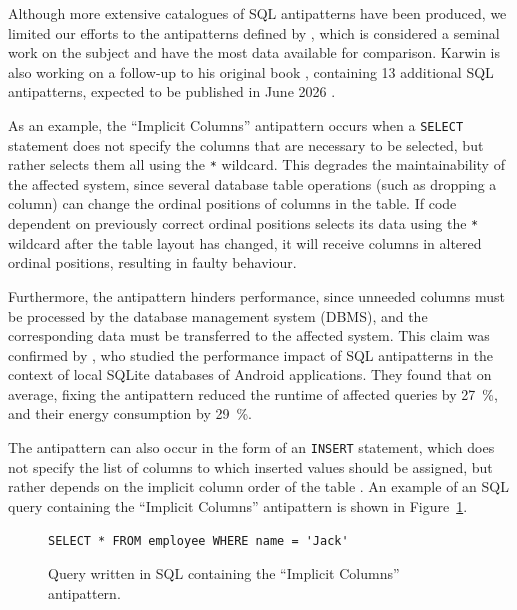 Although more extensive catalogues of SQL antipatterns have been produced, we limited our efforts to the antipatterns defined by , which is considered a seminal work on the subject  and have the most data available for comparison. Karwin is also working on a follow-up to his original book , containing \num{13} additional SQL antipatterns, expected to be published in June 2026 .

As an example, the “Implicit Columns” antipattern  occurs when a \texttt{SELECT} statement does not specify the columns that are necessary to be selected, but rather selects them all using the \texttt{*} wildcard. This degrades the maintainability of the affected system, since several database table operations (such as dropping a column) can change the ordinal positions of columns in the table. If code dependent on previously correct ordinal positions selects its data using the \texttt{*} wildcard after the table layout has changed, it will receive columns in altered ordinal positions, resulting in faulty behaviour.

Furthermore, the antipattern hinders performance, since unneeded columns must be processed by the database management system (DBMS), and the corresponding data must be transferred to the affected system. This claim was confirmed by , who studied the performance impact of SQL antipatterns in the context of local SQLite databases of Android applications. They found that on average, fixing the antipattern reduced the runtime of affected queries by \qty{27}{\percent}, and their energy consumption by \qty{29}{\percent}.

The antipattern can also occur in the form of an \texttt{INSERT} statement, which does not specify the list of columns to which inserted values should be assigned, but rather depends on the implicit column order of the table . An example of an SQL query containing the “Implicit Columns” antipattern is shown in Figure~\ref{fig:implicitColumnsSql}.

\begin{figure}[h]
    \begin{lstlisting}[frame=none, basicstyle=\small]
SELECT * FROM employee WHERE name = 'Jack'
    \end{lstlisting}
    \caption{Query written in SQL containing the “Implicit Columns” antipattern.}
    \label{fig:implicitColumnsSql}
\end{figure}

